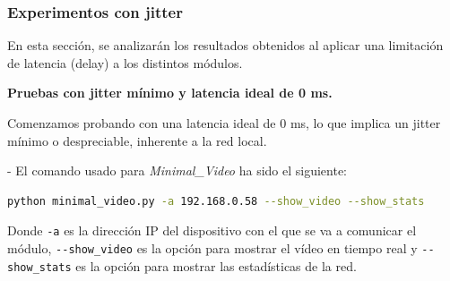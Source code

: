 \subsubsection{Experimentos con jitter}

En esta sección, se analizarán los resultados obtenidos al aplicar una limitación de latencia (delay) a los distintos módulos.
\vspace{\baselineskip}

\textbf{Pruebas con jitter mínimo y latencia ideal de 0 ms.}

Comenzamos probando con una latencia ideal de 0 ms, lo que implica un jitter mínimo o despreciable, inherente a la red local.

- El comando usado para \textit{Minimal\_Video} ha sido el siguiente:
\vspace{\baselineskip}

\begin{lstlisting}[language=bash]
python minimal_video.py -a 192.168.0.58 --show_video --show_stats
\end{lstlisting}
Donde \verb|-a| es la dirección IP del dispositivo con el que se va a comunicar el módulo, \verb|--show_video| es la opción para mostrar el vídeo en tiempo real y \verb|--show_stats| es la opción para mostrar las estadísticas de la red.
\vspace{\baselineskip}

